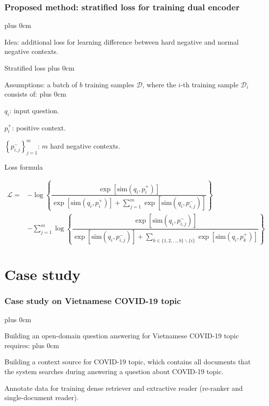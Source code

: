 \documentclass[11pt]{beamer}
\renewcommand{\raggedright}{\leftskip=0pt \rightskip=0pt plus 0cm}
\let\olditemize=\itemize
\renewenvironment{itemize}{\olditemize\raggedright}{\endlist}
\begin{document}
\begin{frame}
\frametitle{Proposed method: stratified loss for training dual encoder}
\begin{adjustwidth}{-2em}{0em}
\begin{itemize}
	\item Idea: additional loss for learning difference between hard negative and normal negative contexts.
	\item Stratified loss
	\begin{itemize}
		\item Assumptions: a batch of $b$ training samples $\mathcal{D}$, where the $i$-th training sample $\mathcal{D}_i$ consists of:
		\begin{itemize}
			\item $q_i$: input question.
			\item $p_i^+$: positive context.
			\item $\left\{p_{i,j}^-\right\}_{j=1}^m$: $m$ hard negative contexts.
		\end{itemize}
		\item Loss formula
	\end{itemize}
\end{itemize}
\begin{scriptsize}
\begin{equation}
	\label{eq:04}
	\begin{array}{ll}
		\mathcal{L} = &-\log\left\{\dfrac{\exp\left[{\text{sim}\left(q_i, p_i^+\right)}\right]}{\exp\left[{\text{sim}\left(q_i, p_i^+\right)}\right] + \sum\limits_{j=1}^m \exp\left[{\text{sim}\left(q_i, p_{i,j}^-\right)}\right]}\right\} \\[20pt]
		&-\sum\limits_{j=1}^m\log\left\{\dfrac{\exp\left[{\text{sim}\left(q_i, p_{i,j}^-\right)}\right]}{\exp\left[{\text{sim}\left(q_i, p_{i,j}^-\right)}\right] + \sum\limits_{k \in \{1,2,...,b\} \backslash \{i\}}\exp\left[\text{sim}\left(q_i, p_k^+\right)\right]}\right\}
	\end{array}
\end{equation}
\end{scriptsize}
\end{adjustwidth}
\end{frame}
\section{Case study}
\begin{frame}
	\frametitle{Case study on Vietnamese COVID-19 topic}
	\begin{itemize}
		\item Building an open-domain question answering for Vietnamese COVID-19 topic requires:
		\begin{itemize}
			\item Building a context source for COVID-19 topic, which contains all documents that the system searches during answering a question about COVID-19 topic.
			\item Annotate data for training dense retriever and extractive reader (re-ranker and single-document reader).
		\end{itemize}
	\end{itemize}
\end{frame}
\end{document}
